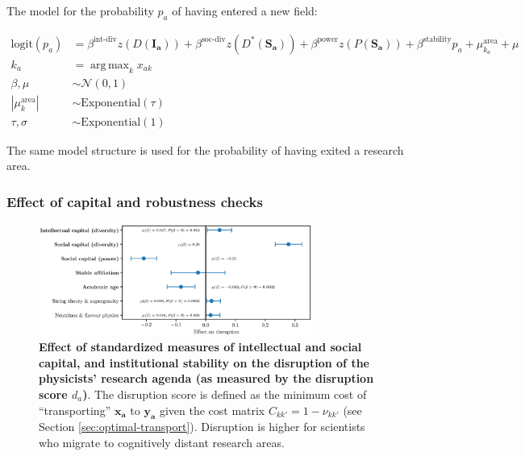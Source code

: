 \documentclass{article}
\DeclareMathOperator*{\argmax}{arg\,max}
\begin{document}
The model for the probability $p_a$ of having entered a new field:

\begin{align*}
    \mathrm{logit}(p_a) &= \beta^{\text{int-div}} z(D(\bm{I_a}))+\beta^{\text{soc-div}}z(D^{\ast}(\bm{S_a})) + \beta^{\text{power}} z(P(\bm{S_a})) + \beta^{\text{stability}} p_a   + \mu^{\text{area}}_{k_a} + \mu\\
    k_a &= \argmax_k x_{ak}\\
    \beta,\mu &\sim \mathcal{N}(0, 1)\\
    |\mu^{\text{area}}_k| &\sim \mathrm{Exponential}(\tau)\\
    \tau,\sigma &\sim \mathrm{Exponential}(1)
\end{align*}

The same model structure is used for the probability of having exited a research area.

\subsubsection{\label{appendix:robustness}Effect of capital and robustness checks}


\begin{figure}[H]
    \centering
    \includegraphics[width=0.8\textwidth]{Fig16.eps}
    \caption{\textbf{Effect of standardized measures of intellectual and social capital, and institutional stability on the disruption of the physicists' research agenda (as measured by the disruption score $d_a$)}. The disruption score is defined as the minimum cost of ``transporting'' $\bm{x_a}$ to $\bm{y_a}$ given the cost matrix $C_{kk'}=1-\nu_{kk'}$ (see Section \ref{sec:optimal-transport}). Disruption is higher for scientists who migrate to cognitively distant research areas.}
    \label{fig:disruption_score_effect}
\end{figure}





\end{document}
